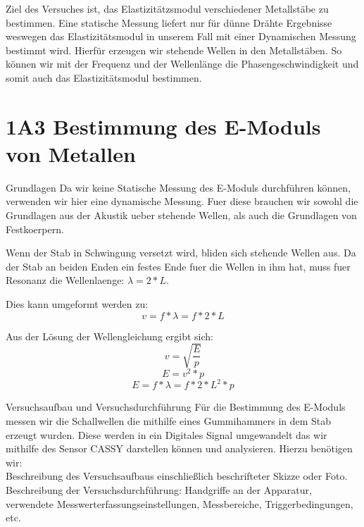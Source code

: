 \documentclass[twoside]{protokoll}
\begin{document}
 
\begin{versuchsziele}
Ziel des Versuches ist, das Elastizitätzsmodul verschiedener Metallstäbe zu bestimmen.
Eine statische Messung liefert nur für dünne Drähte Ergebnisse weswegen das Elastizitätsmodul in unserem Fall mit einer Dynamischen Messung bestimmt wird. Hierfür erzeugen wir stehende Wellen in den Metallstäben. So können wir mit der Frequenz und der Wellenlänge die Phasengeschwindigkeit und somit auch das Elastizitätsmodul bestimmen. 
\end{versuchsziele}

 
\section{1A3 Bestimmung des E-Moduls von Metallen}

\begin{aufgabe}{Grundlagen}
    Da wir keine Statische Messung des E-Moduls durchführen können, verwenden wir hier eine dynamische Messung.
    Fuer diese brauchen wir sowohl die Grundlagen aus der Akustik ueber stehende Wellen, als auch die Grundlagen von Festkoerpern.

     
    Wenn der Stab in Schwingung versetzt wird, bliden sich stehende Wellen aus.
    Da der Stab an beiden Enden ein festes Ende fuer die Wellen in ihm hat, muss fuer Resonanz die Wellenlaenge: $\lambda = 2 * L$. 
     
    Dies kann umgeformt werden zu:
    \begin{equation}
        v = f * \lambda = f * 2 * L
    \end{equation}

    Aus der Lösung der Wellengleichung ergibt sich:
    \begin{equation}
         v = \sqrt{\frac{E}{p}}
    \end{equation}
    \begin{equation}
         E = v ^2 * p
    \end{equation}
    \begin{equation}
         E = f * \lambda = f * 2 * L ^2 * p
    \end{equation}

     
\end{aufgabe}

\begin{aufgabe}{Versuchsaufbau und Versuchsdurchführung}
  Für die Bestimmung des E-Moduls messen wir die Schallwellen die mithilfe eines Gummihammers in dem Stab erzeugt wurden. Diese werden in ein Digitales Signal umgewandelt das wir mithilfe des Sensor CASSY darstellen können und analysieren. Hierzu benötigen wir:\\

  Beschreibung des Versuchsaufbaus einschließlich beschrifteter Skizze
  oder Foto. Beschreibung der Versuchsdurchführung: Handgriffe an der
  Apparatur, verwendete Messwerterfassungseinstellungen, Messbereiche,
  Triggerbedingungen, etc.
\end{aufgabe}
\end{document}
